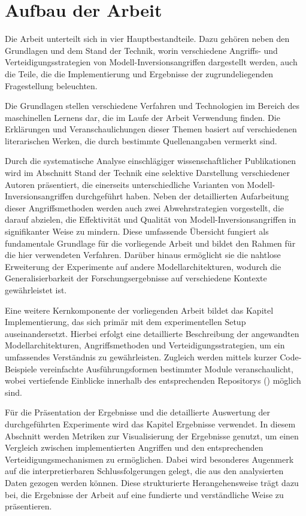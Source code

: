 \section{Aufbau der Arbeit} \label{chpt:Einleitung_Aufbau_der_Arbeit}
Die Arbeit unterteilt sich in vier Hauptbestandteile. Dazu gehören neben den \glqq Grundlagen\grqq{} und dem \glqq Stand der Technik\grqq{}, worin verschiedene Angriffs- und Verteidigungsstrategien von Modell-Inversionsangriffen dargestellt werden, auch die Teile, die die Implementierung und Ergebnisse der zugrundeliegenden Fragestellung beleuchten. 

Die \glqq Grundlagen\grqq{} stellen verschiedene Verfahren und Technologien im Bereich des maschinellen Lernens dar, die im Laufe der Arbeit Verwendung finden. Die Erklärungen und Veranschaulichungen dieser Themen basiert auf verschiedenen literarischen Werken, die durch bestimmte Quellenangaben vermerkt sind.

Durch die systematische Analyse einschlägiger wissenschaftlicher Publikationen wird im Abschnitt \glqq Stand der Technik\grqq{} eine selektive Darstellung verschiedener Autoren präsentiert, die einerseits unterschiedliche Varianten von Modell-Inversionsangriffen durchgeführt haben. Neben der detaillierten Aufarbeitung dieser Angriffsmethoden werden auch zwei Abwehrstrategien vorgestellt, die darauf abzielen, die Effektivität und Qualität von Modell-Inversionsangriffen in signifikanter Weise zu mindern. Diese umfassende Übersicht fungiert als fundamentale Grundlage für die vorliegende Arbeit und bildet den Rahmen für die hier verwendeten Verfahren. Darüber hinaus ermöglicht sie die nahtlose Erweiterung der Experimente auf andere Modellarchitekturen, wodurch die Generalisierbarkeit der Forschungsergebnisse auf verschiedene Kontexte gewährleistet ist.

Eine weitere Kernkomponente der vorliegenden Arbeit bildet das Kapitel \glqq Implementierung\grqq{}, das sich primär mit dem experimentellen Setup auseinandersetzt. Hierbei erfolgt eine detaillierte Beschreibung der angewandten Modellarchitekturen, Angriffsmethoden und Verteidigungsstrategien, um ein umfassendes Verständnis zu gewährleisten. Zugleich werden mittels kurzer Code-Beispiele vereinfachte Ausführungsformen bestimmter Module veranschaulicht, wobei vertiefende Einblicke innerhalb des entsprechenden Repositorys (\cite{weber_hosthansba_code_2024}) möglich sind.

Für die Präsentation der Ergebnisse und die detaillierte Auswertung der durchgeführten Experimente wird das Kapitel \glqq Ergebnisse\grqq{} verwendet. In diesem Abschnitt werden Metriken zur Visualisierung der Ergebnisse genutzt, um einen Vergleich zwischen implementierten Angriffen und den entsprechenden Verteidigungsmechanismen zu ermöglichen. Dabei wird besonderes Augenmerk auf die interpretierbaren Schlussfolgerungen gelegt, die aus den analysierten Daten gezogen werden können. Diese strukturierte Herangehensweise trägt dazu bei, die Ergebnisse der Arbeit auf eine fundierte und verständliche Weise zu präsentieren.